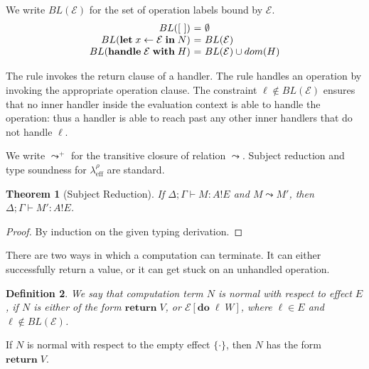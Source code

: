 \documentclass[12pt,mscres,cdtppar,twoside,openright,logo,rightchapter,normalheadings]{infthesis}
\makeatletter
\newtheorem{theorem}{Theorem}[section]
\newtheorem{definition}[theorem]{Definition}
\theoremstyle{definition}
\newcommand{\Calc}{\ensuremath{\lambda_{\text{eff}}^\rho}\xspace}
\newcommand{\semlab}[1]{\text{\scshape{S-#1}}}
\newcommand{\revto}{\ensuremath{\leftarrow}}
\newcommand{\keyw}[1]{\textbf{#1}}
\newcommand{\Handle}{\keyw{handle}}
\newcommand{\With}{\keyw{with}}
\newcommand{\Let}{\keyw{let}}
\newcommand{\In}{\keyw{in}}
\newcommand{\Do}{\keyw{do}}
\newcommand{\Return}{\keyw{return}}
\newcommand{\eff}{!}
\newcommand{\typc}[3]{#1 \vdash #2 \eff #3}
\newcommand{\reducesto}[0]{\ensuremath{\leadsto}}
\newcommand{\ba}{\begin{array}}
\newcommand{\ea}{\end{array}}
\newenvironment{equations}{\[\ba{@{}r@{~}c@{~}l@{}}}{\ea\]\ignorespacesafterend}
\makeatother
\begin{document}
We write $BL(\mathcal{E})$ for the set of operation labels bound by
$\mathcal{E}$.
\begin{equations}
BL([~])                            &=& \emptyset \\
BL(\Let\;x \revto \mathcal{E}\;\In\;N)    &=& BL(\mathcal{E}) \\
BL(\Handle\;\mathcal{E}\;\With\;H) &=& BL(\mathcal{E}) \cup dom(H) \\
\end{equations}

The rule \semlab{Handle-Ret} invokes the return clause of a
handler. The rule \semlab{Handle-op} handles an operation by invoking
the appropriate operation clause. The constraint
$\ell \notin BL(\mathcal{E})$ ensures that no inner handler inside the
evaluation context is able to handle the operation: thus a handler is
able to reach past any other inner handlers that do not handle $\ell$.


We write $\reducesto^+$ for the transitive closure of relation $\reducesto$.
%
Subject reduction and type soundness for $\Calc$ are standard.

\begin{theorem}[Subject Reduction]
If $\typc{\Delta;\Gamma}{M : A}{E}$ and $M \reducesto M'$, then
$\typc{\Delta;\Gamma}{M' : A}{E}$.
\end{theorem}
\begin{proof}
By induction on the given typing derivation.
\end{proof}

There are two ways in which a computation can terminate. It can either
successfully return a value, or it can get stuck on an unhandled
operation.
\begin{definition}
We say that computation term $N$ is normal with respect to effect $E$,
if $N$ is either of the form $\Return\;V$, or
$\mathcal{E}[\Do\;\ell\;W]$, where $\ell \in E$ and $\ell \notin
BL(\mathcal{E})$.
\end{definition}
If $N$ is normal with respect to the empty effect $\{\cdot\}$, then
$N$ has the form $\Return\;V$.
\end{document}
